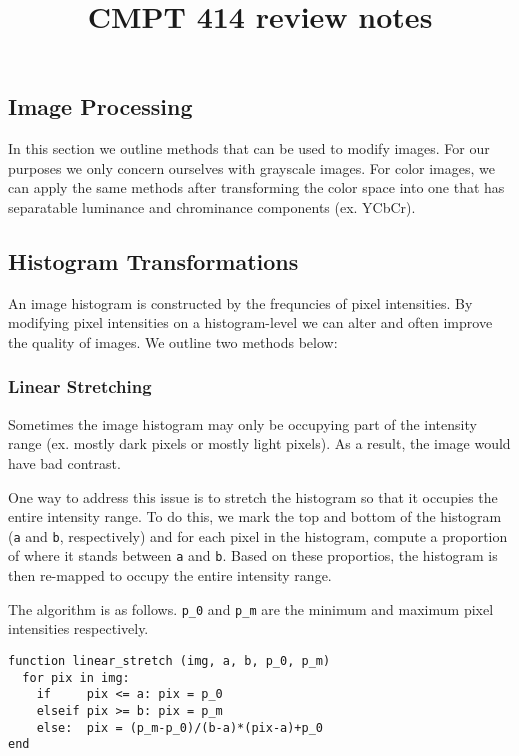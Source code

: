 \documentclass{article}
\title{CMPT 414 review notes}
\author{}
\date{}
\begin{document}
\maketitle

\begin{multicols}{2}

\section{Image Processing}

In this section we outline methods that can be used to modify images. For our purposes we only concern ourselves with grayscale images. For color images, we can apply the same methods after transforming the color space into one that has separatable luminance and chrominance components (ex. YCbCr).

\subsection{Histogram Transformations}

An image histogram is constructed by the frequncies of pixel intensities. By modifying pixel intensities on a histogram-level we can alter and often improve the quality of images. We outline two methods below:

\subsubsection{Linear Stretching}

Sometimes the image histogram may only be occupying part of the intensity range (ex. mostly dark pixels or mostly light pixels). As a result, the image would have bad contrast.

One way to address this issue is to stretch the histogram so that it occupies the entire intensity range. To do this, we mark the top and bottom of the histogram (\texttt{a} and \texttt{b}, respectively) and for each pixel in the histogram, compute a proportion of where it stands between \texttt{a} and \texttt{b}. Based on these proportios, the histogram is then re-mapped to occupy the entire intensity range.

The algorithm is as follows. \texttt{p\_0} and \texttt{p\_m} are the minimum and maximum pixel intensities respectively.

\begin{verbatim}
function linear_stretch (img, a, b, p_0, p_m)
  for pix in img:
    if     pix <= a: pix = p_0
    elseif pix >= b: pix = p_m
    else:  pix = (p_m-p_0)/(b-a)*(pix-a)+p_0
end
\end{verbatim}


\end{multicols}
\end{document}

